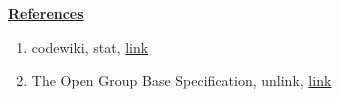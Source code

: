 \documentclass[12pt]{article}
\begin{document}
\begin{enumerate}[1.]
\begin{enumerate}[a)]
        \bigskip

        \underline{\textbf{References}}

        \begin{enumerate}[1)]
            \item codewiki, stat, \href{http://codewiki.wikidot.com/c:system-calls:stat}{link}
            \item The Open Group Base Specification, unlink, \href{https://pubs.opengroup.org/onlinepubs/009695399/functions/unlink.html}{link}
        \end{enumerate}

    \end{enumerate}
\end{enumerate}
\end{document}
